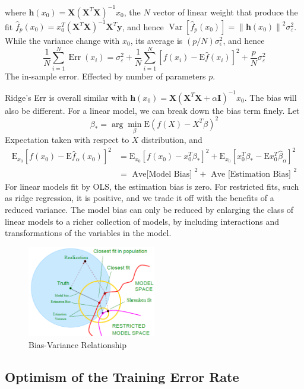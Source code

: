 where $\mathbf{h}\left(x_{0}\right)=\mathbf{X}\left(\mathbf{X}^{T} \mathbf{X}\right)^{-1} x_{0}$, the $N$ vector of linear weight that produce the fit $\hat{f}_{p}\left(x_{0}\right)=x_{0}^{T}\left(\mathbf{X}^{T} \mathbf{X}\right)^{-1} \mathbf{X}^{T} \mathbf{y}$, and hence $\operatorname{Var}\left[\hat{f}_{p}\left(x_{0}\right)\right]=\left\|\mathbf{h}\left(x_{0}\right)\right\|^{2} \sigma_{\varepsilon}^{2}$. While the variance change with $x_0$, its average is $(p/N)\sigma_{\epsilon}^2$, and hence
\begin{equation*}
    \frac{1}{N} \sum_{i=1}^{N} \operatorname{Err}\left(x_{i}\right)=\sigma_{\varepsilon}^{2}+\frac{1}{N} \sum_{i=1}^{N}\left[f\left(x_{i}\right)-\mathrm{E} \hat{f}\left(x_{i}\right)\right]^{2}+\frac{p}{N} \sigma_{\varepsilon}^{2}
\end{equation*}
The in-sample error. Effected by number of parameters $p$. 

Ridge's Err is overall similar with $\mathbf{h}\left(x_{0}\right)=\mathbf{X}\left(\mathbf{X}^{T} \mathbf{X}+\alpha \mathbf{I}\right)^{-1} x_{0}$. The bias will also be different. For a linear model, we can break down the bias term finely. Let
\begin{equation*}
    \beta_{*}=\arg \min _{\beta} \mathrm{E}\left(f(X)-X^{T} \beta\right)^{2}
\end{equation*}
Expectation taken with respect to $X$ distribution, and
\begin{align*}
    \mathrm{E}_{x_{0}}\left[f\left(x_{0}\right)-\mathrm{E} \hat{f}_{\alpha}\left(x_{0}\right)\right]^{2} &=\mathrm{E}_{x_{0}}\left[f\left(x_{0}\right)-x_{0}^{T} \beta_{*}\right]^{2}+\mathrm{E}_{x_{0}}\left[x_{0}^{T} \beta_{*}-\mathrm{E} x_{0}^{T} \hat{\beta}_{\alpha}\right]^{2} \\&=\text { Ave[Model Bias] }^{2}+\text { Ave [Estimation Bias] }^{2}
\end{align*}
For linear models fit by OLS, the estimation bias is zero.
For restricted fits, such as ridge regression, it is positive, and we trade it off
with the benefits of a reduced variance. The model bias can only be reduced
by enlarging the class of linear models to a richer collection of models, by
including interactions and transformations of the variables in the model.
\begin{figure}[H]
    \centering
    \includegraphics[width=0.5\textwidth]{Figures/BiasVariance}
    \caption{Bias-Variance Relationship}
    \label{fig:}
\end{figure}

\subsection{Optimism of the Training Error Rate}